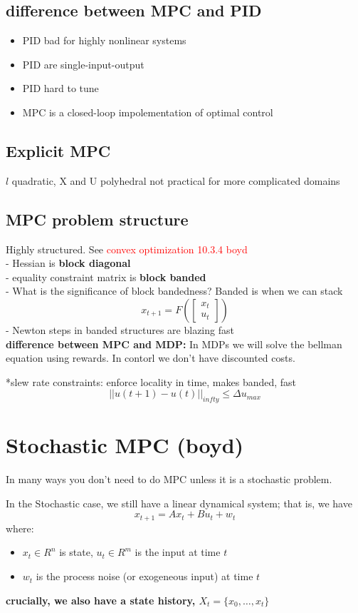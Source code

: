 \documentclass[11pt]{article}
\newcommand\later[1]{\textcolor{red}{#1}}
\begin{document}
\subsection{difference between MPC and PID}
\begin{itemize}
\item PID bad for highly nonlinear systems
\item PID are single-input-output
\item PID hard to tune
  \item MPC is a closed-loop impolementation of optimal control
\end{itemize}

\subsection{Explicit MPC}
$l$ quadratic, X and U polyhedral
not practical for more complicated domains

\subsection{MPC problem structure}
Highly structured. See \later{convex optimization 10.3.4 boyd}\\
- Hessian is \textbf{block diagonal}\\
- equality constraint matrix is \textbf{block banded}\\
- What is the significance of block bandedness?
 Banded is when we can stack \[
   x_{t+1} = F(\begin{bmatrix}
     x_t\\
     u_t
   \end{bmatrix})
 \]
 - Newton steps in banded structures are blazing fast\\
 \textbf{difference between MPC and MDP:}
 In MDPs we will solve the bellman equation using rewards.
 In contorl we don't have discounted costs.

 
*slew rate constraints: enforce locality in time, makes banded, fast
\[ ||u(t+1)-u(t)||_{infty}\leq \Delta u_{max} \]

\section{Stochastic MPC (boyd)}
In many ways you don't need to do MPC unless it is a stochastic problem.

In the Stochastic case, we still have a linear dynamical system; that is, we have
\[x_{t+1} = Ax_t + Bu_t + w_t \]
where:
\begin{itemize}
\item $x_t \in R^n$ is state, $u_t \in R^m$ is the input at time $t$
\item $w_t$ is the process noise (or exogeneous input) at time $t$
\end{itemize}
\textbf{crucially, we also have a state history, $X_t=\{x_0, \ldots, x_t\}$}
\end{document}

